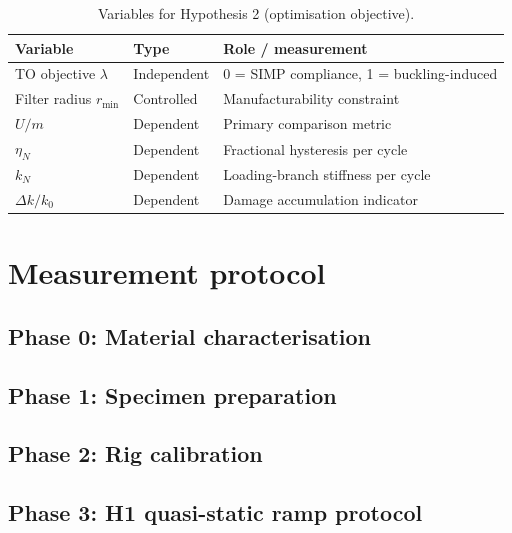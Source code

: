 \documentclass[11pt,a4paper]{article}
\theoremstyle{claim}
\newcommand{\Um}{U/m}
\newcommand{\xy}{x_{\!y}}
\begin{document}
\begin{table}[H]
  \centering\small
  \caption{Variables for Hypothesis 2 (optimisation objective).}
  \label{tab:h2vars}
  \begin{tabularx}{\linewidth}{@{}l l X@{}}
    \toprule
    Variable & Type & Role / measurement \\
    \midrule
    TO objective $\lambda$ & Independent & 0 = SIMP compliance, 1 = buckling-induced \\
    Filter radius $r_{\min}$ & Controlled & Manufacturability constraint \\
    $\Um$   & Dependent & Primary comparison metric \\
    $\eta_N$ & Dependent & Fractional hysteresis per cycle \\
    $k_N$   & Dependent & Loading-branch stiffness per cycle \\
    $\Delta k / k_0$ & Dependent & Damage accumulation indicator \\
    \bottomrule
  \end{tabularx}
\end{table}

\section{Measurement protocol}

\subsection{Phase 0: Material characterisation}

\subsection{Phase 1: Specimen preparation}

\subsection{Phase 2: Rig calibration}

\subsection{Phase 3: H1 quasi-static ramp protocol}
\end{document}

